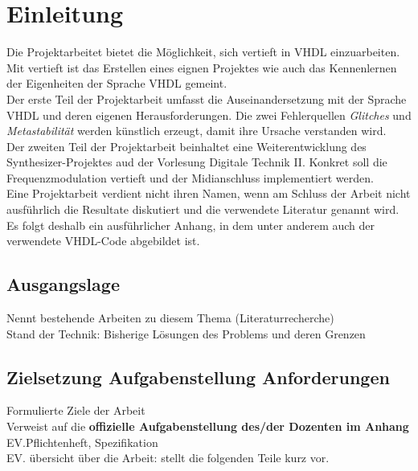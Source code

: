 
\chapter{Einleitung}\label{chap.einleitung}

Die Projektarbeitet bietet die Möglichkeit, sich vertieft in VHDL einzuarbeiten. Mit vertieft ist das Erstellen eines eignen Projektes wie auch  das Kennenlernen der Eigenheiten der Sprache VHDL gemeint.\\

Der erste Teil der Projektarbeit umfasst die Auseinandersetzung mit der Sprache VHDL und deren eigenen Herausforderungen. Die zwei Fehlerquellen \textit{Glitches} und \textit{Metastabilität} werden künstlich erzeugt, damit ihre Ursache verstanden wird. \\

Der zweiten Teil der Projektarbeit beinhaltet eine Weiterentwicklung des Synthesizer-Projektes aud der Vorlesung Digitale Technik II. Konkret soll die Frequenzmodulation vertieft  und der Midianschluss implementiert werden.\\

Eine Projektarbeit verdient nicht ihren Namen, wenn am Schluss der Arbeit nicht ausführlich die Resultate diskutiert und die verwendete Literatur genannt wird. Es folgt deshalb ein ausführlicher Anhang, in dem unter anderem auch der verwendete VHDL-Code abgebildet ist.\\

\section{Ausgangslage}\label{sect.einleitung_ausgangslage}
Nennt bestehende Arbeiten zu diesem Thema (Literaturrecherche)\\
Stand der Technik: Bisherige Lösungen des Problems und deren Grenzen\\

\section{Zielsetzung Aufgabenstellung Anforderungen}\label{sect.einleitung_ziele}
Formulierte Ziele der Arbeit\\
Verweist auf die \textbf{offizielle Aufgabenstellung des/der Dozenten im Anhang}\\
EV.Pflichtenheft, Spezifikation\\
EV. übersicht über die Arbeit: stellt die folgenden Teile kurz vor.\\



